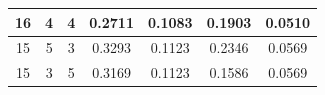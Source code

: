 \documentclass{article}
\begin{document}
\begin{table}[]
{\begin{tabular}{|c|c|c|c|c|c|c|}
16                                   & 4                         & 4                         & 0.2711                                                                                                                                                                                        & 0.1083                                                                                                                                                                                       & 0.1903                                                                                                                                                                                                                                                   & 0.0510                                                                                                                                                                                                                                                \\ \hline
15                                   & 5                         & 3                         & 0.3293                                                                                                                                                                                        & 0.1123                                                                                                                                                                                       & 0.2346                                                                                                                                                                                                                                                   & 0.0569                                                                                                                                                                                                                                                \\ \hline
15                                   & 3                         & 5                         & 0.3169                                                                                                                                                                                        & 0.1123                                                                                                                                                                                       & 0.1586                                                                                                                                                                                                                                                   & 0.0569                                                                                                                                                                                                                                                \\ \hline

\end{tabular}}
\end{table}
\end{document}
